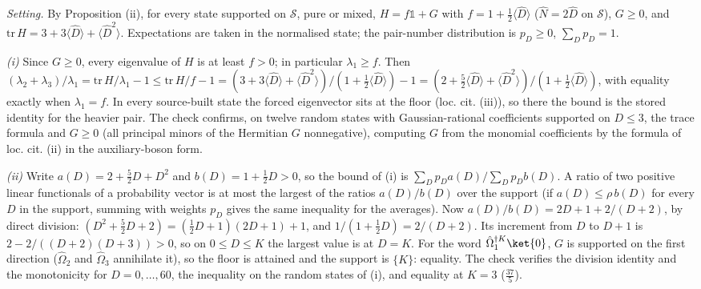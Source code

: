 \emph{Setting.} By Proposition (ii), for every state supported on $\mathcal{S}$, pure or mixed, $H = f\mathbb{1} + G$ with $f = 1 + \tfrac12\langle\hat{D}\rangle$ ($\hat{N} = 2\hat{D}$ on $\mathcal{S}$), $G \ge 0$, and $\mathrm{tr}\,H = 3 + 3\langle\hat{D}\rangle + \langle\hat{D}^{2}\rangle$. Expectations are taken in the normalised state; the pair-number distribution is $p_{D} \ge 0$, $\sum_{D}p_{D} = 1$.

\emph{(i)} Since $G \ge 0$, every eigenvalue of $H$ is at least $f > 0$; in particular $\lambda_{1} \ge f$. Then $(\lambda_{2} + \lambda_{3})/\lambda_{1} = \mathrm{tr}\,H/\lambda_{1} - 1 \le \mathrm{tr}\,H/f - 1 = (3 + 3\langle\hat{D}\rangle + \langle\hat{D}^{2}\rangle)/(1 + \tfrac12\langle\hat{D}\rangle) - 1 = (2 + \tfrac52\langle\hat{D}\rangle + \langle\hat{D}^{2}\rangle)/(1 + \tfrac12\langle\hat{D}\rangle)$, with equality exactly when $\lambda_{1} = f$. In every source-built state the forced eigenvector sits at the floor (loc. cit. (iii)), so there the bound is the stored identity for the heavier pair. The check confirms, on twelve random states with Gaussian-rational coefficients supported on $D \le 3$, the trace formula and $G \ge 0$ (all principal minors of the Hermitian $G$ nonnegative), computing $G$ from the monomial coefficients by the formula of loc. cit. (ii) in the auxiliary-boson form.

\emph{(ii)} Write $a(D) = 2 + \tfrac52 D + D^{2}$ and $b(D) = 1 + \tfrac12 D > 0$, so the bound of (i) is $\sum_{D}p_{D}a(D)/\sum_{D}p_{D}b(D)$. A ratio of two positive linear functionals of a probability vector is at most the largest of the ratios $a(D)/b(D)$ over the support (if $a(D) \le \rho\, b(D)$ for every $D$ in the support, summing with weights $p_{D}$ gives the same inequality for the averages). Now $a(D)/b(D) = 2D + 1 + 2/(D + 2)$, by direct division: $(D^{2} + \tfrac52 D + 2) = (\tfrac12 D + 1)(2D + 1) + 1$, and $1/(1 + \tfrac12 D) = 2/(D + 2)$. Its increment from $D$ to $D + 1$ is $2 - 2/((D + 2)(D + 3)) > 0$, so on $0 \le D \le K$ the largest value is at $D = K$. For the word $\hat\Omega_{1}^{\dagger K}\ket{0}$, $G$ is supported on the first direction ($\hat\Omega_{2}$ and $\hat\Omega_{3}$ annihilate it), so the floor is attained and the support is $\{K\}$: equality. The check verifies the division identity and the monotonicity for $D = 0, \dots, 60$, the inequality on the random states of (i), and equality at $K = 3$ ($\tfrac{37}{5}$).

